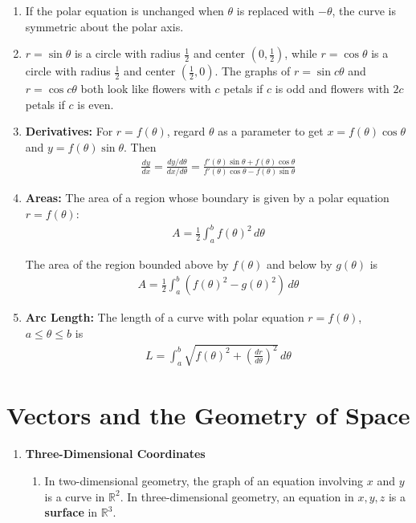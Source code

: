 \documentclass[10pt]{article}
\begin{document}
\begin{multicols*}{2}
\begin{enumerate}
\begin{enumerate}
        \item If the polar equation is unchanged when $\theta$ is replaced with $-\theta$, the curve is symmetric about the polar axis.
        \item $r=\sin{\theta}$ is a circle with radius $\frac{1}{2}$ and center $(0,\frac{1}{2})$, while $r=\cos{\theta}$ is a circle with radius $\frac{1}{2}$ and center $(\frac{1}{2},0)$. The graphs of $r=\sin{c\theta}$ and $r=\cos{c\theta}$ both look like flowers with $c$ petals if $c$ is odd and flowers with $2c$ petals if $c$ is even.
        \item \textbf{Derivatives:} For $r=f(\theta)$, regard $\theta$ as a parameter to get $x = f(\theta)\cos{\theta}$ and $y = f(\theta)\sin{\theta}$. Then
        \begin{align*}
            \frac{dy}{dx} = \frac{dy / d\theta}{dx / d\theta} = \frac{f'(\theta)\sin{\theta} + f(\theta)\cos{\theta}}{f'(\theta)\cos{\theta} - f(\theta)\sin{\theta}}
        \end{align*}
        
        \item \textbf{Areas:} The area of a region whose boundary is given by a polar equation $r=f(\theta)$:
        \begin{align*}
            A = \frac{1}{2} \int_a^b f(\theta)^2 \, d\theta
        \end{align*}
        
        The area of the region bounded above by $f(\theta)$ and below by $g(\theta)$ is
        \begin{align*}
            A = \frac{1}{2} \int_a^b (f(\theta)^2 - g(\theta)^2) \, d\theta
        \end{align*}
        
        \item \textbf{Arc Length:} The length of a curve with polar equation $r=f(\theta)$, $a \leq \theta \leq b$ is
        \begin{align*}
            L = \int_a^b \sqrt{f(\theta)^2 + \left( \frac{dr}{d\theta} \right)^2} \, d\theta
        \end{align*}
    \end{enumerate}
\end{enumerate}


\section{Vectors and the Geometry of Space}
\begin{enumerate}
    \item \textbf{Three-Dimensional Coordinates}
    \begin{enumerate}
        \item In two-dimensional geometry, the graph of an equation involving $x$ and $y$ is a curve in $\mathbb{R}^2$. In three-dimensional geometry, an equation in $x,y,z$ is a \textbf{surface} in $\mathbb{R}^3$.


\end{enumerate}
\end{enumerate}
\end{multicols*}
\end{document}
